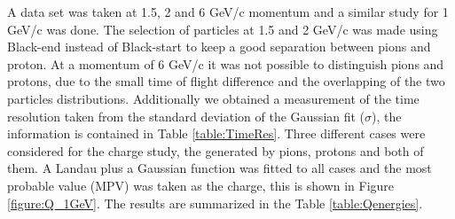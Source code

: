     \begin{table}[b]
      \centering
	\caption{Charge measured for pions, protons and the sum of both. For 6 GeV/c momentum it is not possible to distinguish the particles
	using the time of flight technique.}
	\label{table:Qenergies}
    \end{table}

	

	A data set was taken at 1.5, 2 and 6 GeV/c momentum and a similar study for 1 GeV/c was done. The selection of particles at 1.5 and 2 GeV/c was made using Black-end instead of Black-start to keep a good separation between pions and proton. At a momentum of 6 GeV/c it was not possible to distinguish pions and protons, due to the small time of  flight difference and the overlapping of the two particles distributions. Additionally we obtained a measurement of the time resolution taken from the standard deviation of the Gaussian fit ($\sigma$), the information is contained in Table \ref{table:TimeRes}.
	Three different cases were considered for the charge study, the generated by pions, protons and both of them.
	A Landau plus a Gaussian function was fitted to all cases and the most probable value (MPV) was taken as the charge, this is shown in Figure \ref{figure:Q_1GeV}. The results are summarized in the Table \ref{table:Qenergies}.

